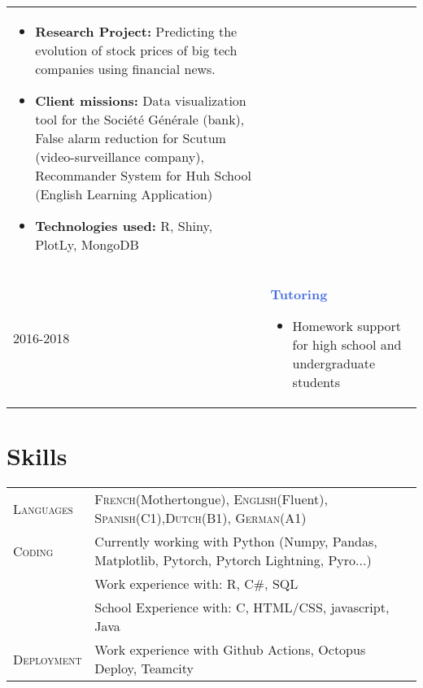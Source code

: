 \documentclass[a4paper,10pt]{article} %
\begin{document}
{\begin{tabular}{p{2cm}p{15cm}}
	\begin{itemize}
		\item \textcolor{pinegreen}{\textbf{Research Project: }} Predicting the evolution of stock prices of big tech companies using financial news.
		\item \textcolor{pinegreen}{\textbf{Client missions: }} Data visualization tool for the Soci\'{e}t\'{e} G\'{e}n\'{e}rale (bank), False alarm reduction for Scutum (video-surveillance company), Recommander System for Huh School (English Learning Application)
		\item \textcolor{pinegreen}{\textbf{Technologies used: }} R, Shiny, PlotLy, MongoDB
	\end{itemize}                                                               \\

	\textsc{2016}-2018 & \textcolor{royalblue}{\textbf{Tutoring}}
	\begin{itemize}
		\item Homework support for high school and undergraduate students
	\end{itemize}
\end{tabular}


\section{Skills}
\begin{tabular}{p{2cm}p{15cm}}
	\textsc{Languages}    & \textsc{French}(Mothertongue), \textsc{English}(Fluent),   \textsc{Spanish}(C1),\textsc{Dutch}(B1), \textsc{German}(A1) \\
	\textsc{Coding} & Currently working with Python (Numpy, Pandas, Matplotlib, Pytorch, Pytorch Lightning, Pyro...)	\\
		 		   		 & Work experience with: R, C\#, SQL                                      \\
	                     & School Experience with: C,  HTML/CSS, javascript, Java                     \\
	\textsc{Deployment} & Work experience with Github Actions, Octopus Deploy, Teamcity\\


\end{tabular}}
\end{document}
